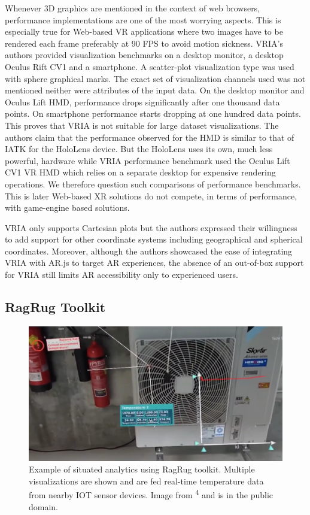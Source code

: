 \documentclass{vgtc}                          %
\begin{document}
\noindent Whenever 3D graphics are mentioned in the context of web browsers,
performance implementations are one of the most worrying aspects. This is
especially true for Web-based VR applications where two images have to be
rendered each frame preferably at 90 FPS to avoid motion sickness. VRIA's
authors provided visualization benchmarks on a desktop monitor, a desktop
Oculus Rift CV1 and a smartphone. A scatter-plot visualization type was used
with sphere graphical marks. The exact set of visualization channels used
was not mentioned neither were attributes of the input data. On the desktop
monitor and Oculus Lift HMD, performance drops significantly after one
thousand data points. On smartphone performance starts dropping at one hundred
data points. This proves that VRIA is not suitable for large dataset
visualizations. The authors claim that the performance observed for the HMD
is similar to that of IATK for the HoloLens device. But the HoloLens uses
its own, much less powerful, hardware while VRIA performance benchmark used
the Oculus Lift CV1 VR HMD which relies on a separate desktop for expensive
rendering operations. We therefore question such comparisons of performance
benchmarks. This is later Web-based XR solutions do not compete,
in terms of performance, with game-engine based solutions.

\smallskip

\noindent VRIA only supports Cartesian plots but the authors expressed their
willingness to add support for other coordinate systems including geographical
and spherical coordinates.
Moreover, although the authors showcased the ease of integrating VRIA with
AR.js to target AR experiences, the absence of an out-of-box support for VRIA
still limits AR accessibility only to experienced users.

\subsection{RagRug Toolkit}

\begin{figure}[tb]
	\centering
	\includegraphics[width=\columnwidth]{ragrug_example}
	\caption[Caption for RagRug]{Example of situated analytics using RagRug
		toolkit. Multiple visualizations are shown and are fed real-time
		temperature data from nearby IOT sensor devices.
		Image from \textsuperscript{4} and is in the public domain. }
	\label{fig:ragrug_example}
\end{figure}
\end{document}
